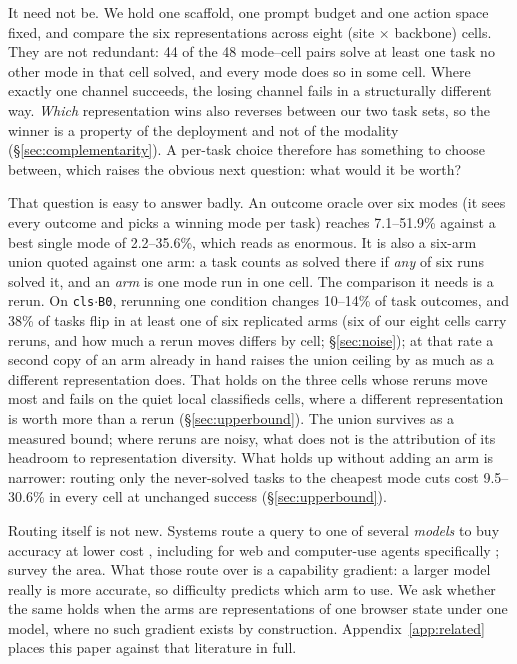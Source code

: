  It need not be. We hold one scaffold, one prompt budget and one action space fixed, and compare the six representations across eight (site $\times$ backbone) cells. They are not redundant: 44 of the 48 mode--cell pairs solve at least one task no other mode in that cell solved, and every mode does so in some cell. Where exactly one channel succeeds, the losing channel fails in a structurally different way. \emph{Which} representation wins also reverses between our two task sets, so the winner is a property of the deployment and not of the modality (\S\ref{sec:complementarity}). A per-task choice therefore has something to choose between, which raises the obvious next question: what would it be worth?

 That question is easy to answer badly. An outcome oracle over six modes (it sees every outcome and picks a winning mode per task) reaches 7.1--51.9\% against a best single mode of 2.2--35.6\%, which reads as enormous. It is also a six-arm union quoted against one arm: a task counts as solved there if \emph{any} of six runs solved it, and an \emph{arm} is one mode run in one cell. The comparison it needs is a rerun. On \texttt{cls$\cdot$B0}, rerunning one condition changes 10--14\% of task outcomes, and 38\% of tasks flip in at least one of six replicated arms (six of our eight cells carry reruns, and how much a rerun moves differs by cell; \S\ref{sec:noise}); at that rate a second copy of an arm already in hand raises the union ceiling by as much as a different representation does. That holds on the three cells whose reruns move most and fails on the quiet local classifieds cells, where a different representation is worth more than a rerun (\S\ref{sec:upperbound}). The union survives as a measured bound; where reruns are noisy, what does not is the attribution of its headroom to representation diversity. What holds up without adding an arm is narrower: routing only the never-solved tasks to the cheapest mode cuts cost 9.5--30.6\% in every cell at unchanged success (\S\ref{sec:upperbound}).

Routing itself is not new. Systems route a query to one of several \emph{models} to buy accuracy at lower cost \citep{chen2023frugalgpt,ong2025routellm}, including for web and computer-use agents specifically \citep{webrouter2025,liu2026adaptive}; \citet{moslem2026routingsurvey} survey the area. What those route over is a capability gradient: a larger model really is more accurate, so difficulty predicts which arm to use. We ask whether the same holds when the arms are representations of one browser state under one model, where no such gradient exists by construction. Appendix~\ref{app:related} places this paper against that literature in full.

